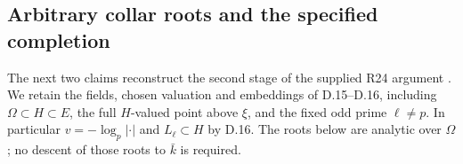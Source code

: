 \subsection{Arbitrary collar roots and the specified completion}

The next two claims reconstruct the second stage of the supplied
R24 argument \citep[Sections~5--6]{D_OpenAI2026}.
We retain the fields, chosen valuation and embeddings of
D.15--D.16, including $\Omega\subset H\subset E$, the full
$H$-valued point above $\xi$, and the fixed odd prime
$\ell\ne p$. In particular $v=-\log_p|\cdot|$ and
$L_\ell\subset H$ by D.16. The roots below are analytic over
$\Omega$; no descent of those roots to $\bar k$ is required.

